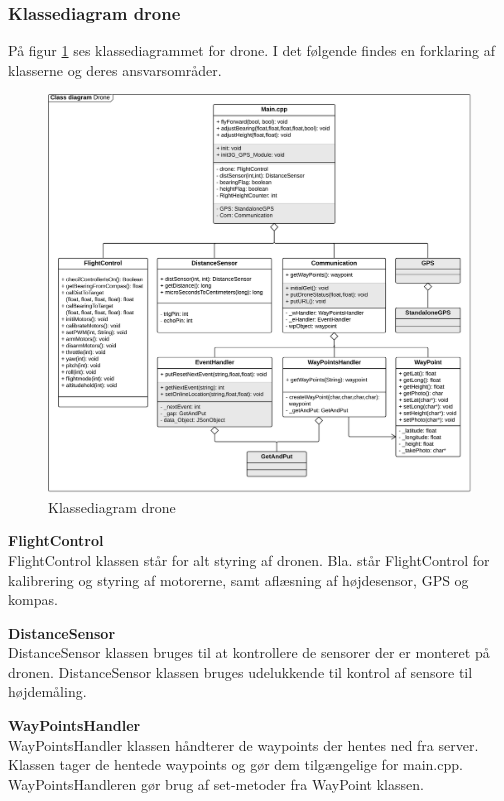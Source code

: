 \newpage
\subsubsection*{Klassediagram drone}

På figur \ref{fig:classDiagram_drone_underflyvning} ses klassediagrammet for drone. I det følgende findes en forklaring af klasserne og deres ansvarsområder. 

\begin{figure}[H]
	\centering
	\includegraphics[width=1\textwidth]{Billeder/klasse_diagrammer/classdiagram_iteration2_drone.png}
	\vspace{-0.7cm}
	\caption{Klassediagram drone}
	\label{fig:classDiagram_drone_underflyvning}
\end{figure}

\textbf{FlightControl} \\
FlightControl klassen står for alt styring af dronen. Bla. står FlightControl for kalibrering og styring af motorerne, samt aflæsning af højdesensor, GPS og kompas. 

\textbf{DistanceSensor} \\
DistanceSensor klassen bruges til at kontrollere de sensorer der er monteret på dronen. DistanceSensor klassen bruges udelukkende til kontrol af sensore til højdemåling. 

\textbf{WayPointsHandler} \\
WayPointsHandler klassen håndterer de waypoints der hentes ned fra server. Klassen tager de hentede waypoints og gør dem tilgængelige for main.cpp. WayPointsHandleren gør brug af set-metoder fra WayPoint klassen.
\newpage

